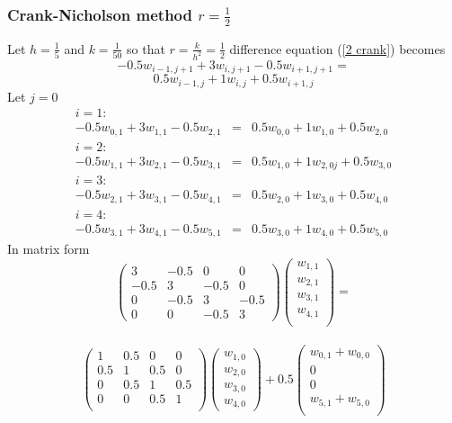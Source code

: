 \begin{example}
\subsubsection{Crank-Nicholson method $r=\frac{1}{2}$}
Let $h=\frac{1}{5}$ and $k=\frac{1}{50}$ so that $r=\frac{k}{h^2}=\frac{1}{2}$
difference equation (\ref{2 crank}) becomes
\[-0.5w_{i-1,j+1}+3w_{i,j+1}-0.5w_{i+1,j+1}=\]
\[
0.5w_{i-1,j}+1w_{i,j}+0.5w_{i+1,j} \]
Let $j=0$
\[\begin{array}{lcl}
i=1:&\\
-0.5w_{0,1}+3w_{1,1}-0.5w_{2,1}&=&0.5w_{0,0}+1w_{1,0}+0.5w_{2,0}\\
i=2:&\\
-0.5w_{1,1}+3w_{2,1}-0.5w_{3,1}&=&0.5w_{1,0}+1w_{2,0j}+0.5w_{3,0}\\
i=3:&\\
-0.5w_{2,1}+3w_{3,1}-0.5w_{4,1}&=&0.5w_{2,0}+1w_{3,0}+0.5w_{4,0}\\
i=4:&\\
-0.5w_{3,1}+3w_{4,1}-0.5w_{5,1}&=&0.5w_{3,0}+1w_{4,0}+0.5w_{5,0}
\end{array}\]
In matrix form
\[\left(\begin{array}{cccc}
3&-0.5&0&0\\
-0.5&3&-0.5&0\\
0&-0.5&3&-0.5\\
0&0&-0.5&3
\end{array}
\right)
\left(\begin{array}{c}
w_{1,1}\\
w_{2,1}\\
w_{3,1}\\
w_{4,1}\\
\end{array}
\right)=\]\
\[\left(\begin{array}{cccc}
1&0.5&0&0\\
0.5&1&0.5&0\\
0&0.5&1&0.5\\
0&0&0.5&1\\

\end{array}
\right)
\left(\begin{array}{c}
w_{1,0}\\
w_{2,0}\\
w_{3,0}\\
w_{4,0}
\end{array}
\right)+0.5
\left(\begin{array}{c}
w_{0,1}+w_{0,0}\\
0\\
0\\
w_{5,1}+w_{5,0}\\
\end{array}
\right)
\]	




\end{example}
